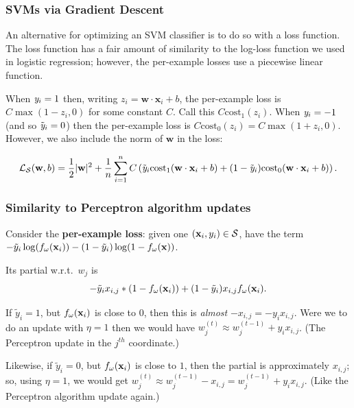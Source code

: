 \documentclass[smaller]{beamer}
\theoremstyle{example}
\newcommand{\x}{\textbf{x}}
\newcommand{\ix}[1]{{\it #1}}
\begin{document}
\begin{frame}
    \frametitle{SVMs via Gradient Descent}
    An alternative for optimizing an SVM classifier is to do so with a loss function. The loss function has a fair amount of similarity to the log-loss function we used in logistic regression; however, the per-example losses use a piecewise linear function.

    When $\ix y_i = 1$ then, writing $z_i = \textbf{w}\cdot\x_i + b$, the per-example loss is $C\max(1-z_i, 0)$ for some constant $C$. Call this $C\text{cost}_1(z_i)$. When $\ix y_i=-1$ (and so $\tilde{\ix y}_i = 0$) then the per-example loss is $C\text{cost}_0(z_i) = C\max(1+z_i, 0)$. However, we also include the norm of $\textbf{w}$ in the loss: 

    \[\mathcal L_{\mathcal S}(\textbf{w}, b) = \frac12|\textbf{w}|^2 + \frac{1}{n}\sum_{i=1}^nC\left(\tilde{\ix y}_i\text{cost}_1(\textbf{w}\cdot\x_i + b) + (1 - \tilde{\ix y}_i)\text{cost}_0(\textbf{w}\cdot\x_i + b)\right).\]
\end{frame}

\begin{frame}
    \frametitle{Similarity to Perceptron algorithm updates}
    Consider the \textbf{per-example loss}: given one $({\bf x}_i, y_i) \in\mathcal S$, have the term $-\tilde y_i\log(f_{\omega}({\bf x}_i)) - (1 - \tilde y_i)\log(1 - f_{\omega}({\bf x}))$.

    Its partial w.r.t.\ $w_j$ is 
        \[-\tilde y_ix_{i,j}\ast(1-f_{\omega}({\bf x}_i)) + (1-\tilde y_i)x_{i,j}f_{\omega}({\bf x}_i).\]

    \pause
    If $\tilde y_i=1$, but $f_{\omega}({\bf x}_i)$ is close to 0, then this is \textit{almost} $-x_{i,j} = -y_i x_{i,j}$. Were we to do an update with $\eta=1$ then we would have $w_j^{(t)} \approx w_j^{(t-1)} + y_i x_{i,j}$. (The Perceptron update in the $j^{th}$ coordinate.)

    \pause
    Likewise, if $\tilde y_i=0$, but $f_{\omega}({\bf x}_i)$ is close to $1$, then the partial is approximately $x_{i,j}$; so, using $\eta=1$, we would get $w_j^{(t)} \approx w_j^{(t-1)} - x_{i,j} = w_j^{(t-1)} + y_ix_{i,j}$. (Like the Perceptron algorithm update again.)
\end{frame}
\end{document}
